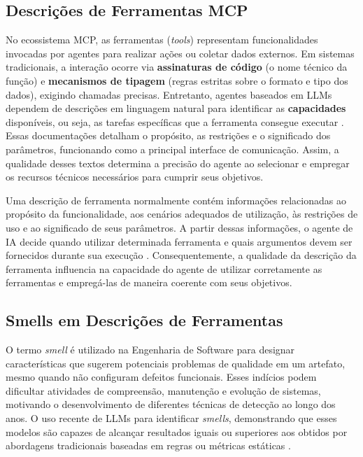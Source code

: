 \subsection{Descrições de Ferramentas MCP}
No ecossistema MCP, as ferramentas (\textit{tools}) representam funcionalidades invocadas por agentes para realizar ações ou coletar dados externos. Em sistemas tradicionais, a interação ocorre via \textbf{assinaturas de código} (o nome técnico da função) e \textbf{mecanismos de tipagem} (regras estritas sobre o formato e tipo dos dados), exigindo chamadas precisas. Entretanto, agentes baseados em LLMs dependem de descrições em linguagem natural para identificar as \textbf{capacidades} disponíveis, ou seja, as tarefas específicas que a ferramenta consegue executar \cite{2026arXiv260214878M}. Essas documentações detalham o propósito, as restrições e o significado dos parâmetros, funcionando como a principal interface de comunicação. Assim, a qualidade desses textos determina a precisão do agente ao selecionar e empregar os recursos técnicos necessários para cumprir seus objetivos.

Uma descrição de ferramenta normalmente contém informações relacionadas ao propósito da funcionalidade, aos cenários adequados de utilização, às restrições de uso e ao significado de seus parâmetros. A partir dessas informações, o agente de IA decide quando utilizar determinada ferramenta e quais argumentos devem ser fornecidos durante sua execução \cite{2026arXiv260214878M}. Consequentemente, a qualidade da descrição da ferramenta influencia na capacidade do agente de utilizar corretamente as ferramentas e empregá-las de maneira coerente com seus objetivos.

\subsection{Smells em Descrições de Ferramentas}
O termo \textit{smell} é utilizado na Engenharia de Software para designar características que sugerem potenciais problemas de qualidade em um artefato, mesmo quando não configuram defeitos funcionais. Esses indícios podem dificultar atividades de compreensão, manutenção e evolução de sistemas, motivando o desenvolvimento de diferentes técnicas de detecção ao longo dos anos. O uso recente de LLMs para identificar \textit{smells}, demonstrando que esses modelos são capazes de alcançar resultados iguais ou superiores aos obtidos por abordagens tradicionais baseadas em regras ou métricas estáticas \cite{souza2026beyond}. 


